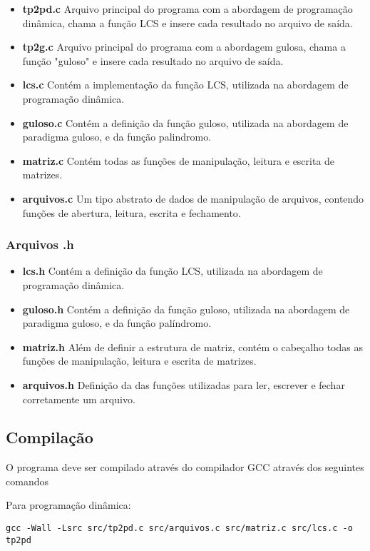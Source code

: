 \documentclass[12pt]{article}
\begin{document}
\begin{itemize}
\item \textbf{tp2pd.c} Arquivo principal do programa com a abordagem de programação dinâmica, chama a função LCS e insere cada resultado no arquivo de saída.
\item \textbf{tp2g.c} Arquivo principal do programa com a abordagem gulosa, chama a função "guloso" e insere cada resultado no arquivo de saída.
\item \textbf{lcs.c} Contém a implementação da função LCS, utilizada na abordagem de programação dinâmica.
\item \textbf{guloso.c} Contém a definição da função guloso, utilizada na abordagem de paradigma guloso, e da função palindromo.
\item \textbf{matriz.c} Contém todas as funções de manipulação, leitura e escrita de matrizes.
\item \textbf{arquivos.c} Um tipo abstrato de dados de manipulação de arquivos, contendo funções de abertura, leitura, escrita e fechamento.
\end{itemize}

\subsubsection{Arquivos .h}

\begin{itemize}
\item \textbf{lcs.h} Contém a definição da função LCS, utilizada na abordagem de programação dinâmica.
\item \textbf{guloso.h} Contém a definição da função guloso, utilizada na abordagem de paradigma guloso, e da função palíndromo.
\item \textbf{matriz.h} Além de definir a estrutura de matriz, contém o cabeçalho todas as funções de manipulação, leitura e escrita de matrizes.
\item \textbf{arquivos.h} Definição da das funções utilizadas para ler, escrever e fechar corretamente um arquivo.
\end{itemize}

\subsection{Compilação}

O programa deve ser compilado através do compilador GCC através dos seguintes comandos

Para programação dinâmica:
\begin{footnotesize}
\begin{verbatim}
gcc -Wall -Lsrc src/tp2pd.c src/arquivos.c src/matriz.c src/lcs.c -o tp2pd \end{verbatim}
\end{footnotesize}
\end{document}
